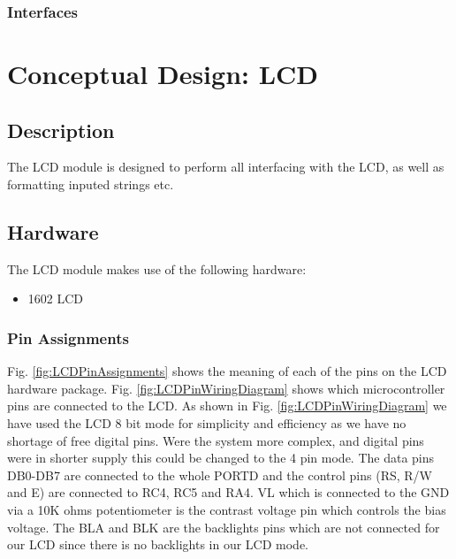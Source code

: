 \documentclass[]{report}
\begin{document}
\subsubsection{Interfaces}

\section{Conceptual Design: LCD}
\subsection{Description}
The LCD module is designed to perform all interfacing with the LCD, as well as formatting inputed strings etc.

\subsection{Hardware}
The LCD module makes use of the following hardware:
\begin{itemize}
	\item 1602 LCD
\end{itemize}

\subsubsection{Pin Assignments}
Fig. \ref{fig:LCDPinAssignments} shows the meaning of each of the pins on the LCD hardware package. Fig. \ref{fig:LCDPinWiringDiagram} shows which microcontroller pins are connected to the LCD. As shown in Fig. \ref{fig:LCDPinWiringDiagram} we have used the LCD 8 bit mode for simplicity and efficiency as we have no shortage of free digital pins. Were the system more complex, and digital pins were in shorter supply this could be changed to the 4 pin mode. \newline
The data pins DB0-DB7 are connected to the whole PORTD and the control pins (RS, R/W and E) are connected to RC4, RC5 and RA4. VL which is connected to the GND via a 10K ohms potentiometer is the contrast voltage pin which controls the bias voltage. The BLA and BLK are the backlights pins which are not connected for our LCD since there is no backlights in our LCD mode.
\end{document}
